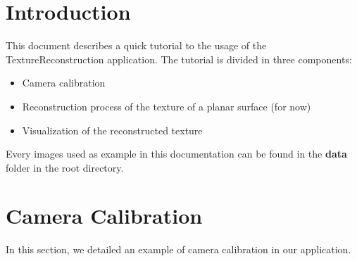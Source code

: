 \documentclass[12pt]{article}
\begin{document}
\maketitle

\section{Introduction}
This document describes a quick tutorial to the usage of the TextureReconstruction application.
The tutorial is divided in three components:
\begin{itemize}
    \item Camera calibration
    \item Reconstruction process of the texture of a planar surface (for now)
    \item Visualization of the reconstructed texture
\end{itemize}
Every images used as example in this documentation can be found in the \textbf{data} folder in the root directory.


\section{Camera Calibration}
\label{sec:calib}
In this section, we detailed an example of camera calibration in our application.
\end{document}
